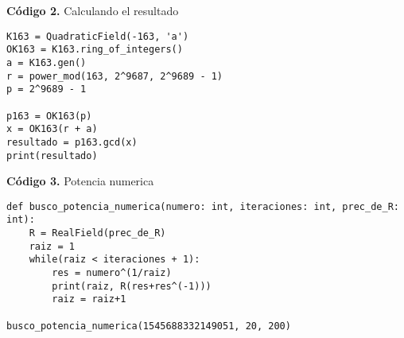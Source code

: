 \documentclass[12pt]{amsart}
\theoremstyle{plain}
\begin{document}
\vspace{1em}
\noindent\textbf{Código 2.} Calculando el resultado
\label{codigo2}

\lstset{
    language=Python,
    basicstyle=\ttfamily\small,
    frame=single,
    breaklines=true
}

\begin{lstlisting}
K163 = QuadraticField(-163, 'a')
OK163 = K163.ring_of_integers()
a = K163.gen()
r = power_mod(163, 2^9687, 2^9689 - 1)
p = 2^9689 - 1

p163 = OK163(p)
x = OK163(r + a)
resultado = p163.gcd(x)
print(resultado)
\end{lstlisting}

\vspace{1em}
\noindent\textbf{Código 3.} Potencia numerica
\label{codigo3}

\lstset{
    language=Python,
    basicstyle=\ttfamily\small,
    frame=single,
    breaklines=true
}

\begin{lstlisting}
def busco_potencia_numerica(numero: int, iteraciones: int, prec_de_R: int):
    R = RealField(prec_de_R)
    raiz = 1
    while(raiz < iteraciones + 1):
        res = numero^(1/raiz)
        print(raiz, R(res+res^(-1)))
        raiz = raiz+1

busco_potencia_numerica(1545688332149051, 20, 200)
\end{lstlisting}

\newpage
\end{document}
